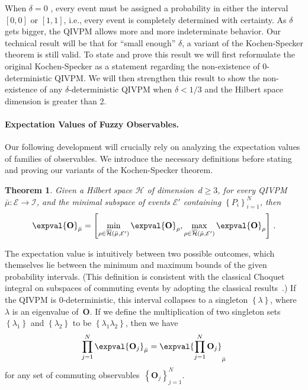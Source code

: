 \documentclass[english,reprint, aps, prl,superscriptaddress, showpacs,
showkeys, longbibliography, amsmath, amssymb]{revtex4-1}
\theoremstyle{plain}
\newtheorem{thm}{Theorem}
\theoremstyle{definition}
\newcommand{\Hilb}{\mathcal{H}}
\newcommand{\events}{\ensuremath{\mathcal{E}}}
\newcommand{\coreBorn}{\ensuremath{\overline{\Hilb}}}
\begin{document}
When $\delta=0$ , every event must be assigned a probability in either
the interval $[0,0]$ or $[1,1]$, i.e., every event is completely
determined with certainty. As $\delta$ gets bigger, the QIVPM allows
more and more indeterminate behavior. Our technical result will be
that for ``small enough'' $\delta$, a variant of the Kochen-Specker
theorem is still valid. To state and prove this result we will first
reformulate the original Kochen-Specker as a statement regarding the
non-existence of $0$-deterministic QIVPM. We will then strengthen this
result to show the non-existence of any $\delta$-deterministic QIVPM
when $\delta < 1/3$ and the Hilbert space dimension is greater than
2. 

\paragraph*{Expectation Values of Fuzzy Observables.}  Our following
development will crucially rely on analyzing the expectation values of
families of observables. We introduce the necessary definitions before
stating and proving our variants of the Kochen-Specker theorem.

\begin{thm} Given a Hilbert space $\Hilb$ of dimension~$d\ge3$,
  for every QIVPM~$\bar{\mu}:\events\rightarrow\mathscr{I}$, and the minimal
  subspace of events $\events'$ containing
  $\left\{ P_{i}\right\} _{i=1}^{N}$, then
\begin{equation}
\expval{\mathbf{O}}_{\bar{\mu}}=\left[\min_{\rho\in\coreBorn\left(\bar{\mu},\events'\right)}\expval{\mathbf{O}}_{\rho},\max_{\rho\in\coreBorn\left(\bar{\mu},\events'\right)}\expval{\mathbf{O}}_{\rho}\right]\,.\label{eq:quantum-interval-expectation-core}
\end{equation}
\end{thm}

The expectation value is intuitively between two possible outcomes,
which themselves lie between the minimum and maximum bounds of the
given probability intervals. (This definition is consistent with the
classical Choquet integral on subspaces of commuting events by
adopting the classical
results~\cite{GilboaSchmeidler1994,Grabisch2016}.)  If the QIVPM is
0-deterministic, this interval collapses to a singleton
$\left\{ \lambda\right\} $, where $\lambda$ is an eigenvalue
of~$\mathbf{O}$. If we define the multiplication of two singleton
sets~$\left\{ \lambda_{1}\right\} $ and $\left\{ \lambda_{2}\right\} $
to be $\left\{ \lambda_{1}\lambda_{2}\right\} $, then we have
\begin{equation}
\prod_{j=1}^{N}\expval{\mathbf{O}_{j}}_{\bar{\mu}}=\expval{\prod_{j=1}^{N}\mathbf{O}_{j}}_{\bar{\mu}}\label{eq:Kochen-Specker-Rules}
\end{equation}
for any set of commuting observables~$\left\{ \mathbf{O}_{j}\right\}
_{j=1}^{N}$.
\end{document}
